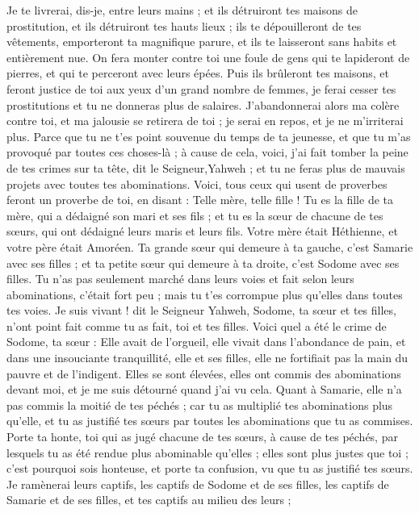\begin{multicols}{2}
Je te livrerai, dis-je, entre leurs mains ; et ils détruiront tes maisons de prostitution, et ils détruiront tes hauts lieux ; ils te dépouilleront de tes vêtements, emporteront ta magnifique parure, et ils te laisseront sans habits et entièrement nue.
On fera monter contre toi une foule de gens qui te lapideront de pierres, et qui te perceront avec leurs épées.
Puis ils brûleront tes maisons, et feront justice de toi aux yeux d’un grand nombre de femmes, je ferai cesser tes prostitutions et tu ne donneras plus de salaires.
J’abandonnerai alors ma colère contre toi, et ma jalousie se retirera de toi ; je serai en repos, et je ne m’irriterai plus.
Parce que tu ne t'es point souvenue du temps de ta jeunesse, et que tu m'as provoqué par toutes ces choses-là ; à cause de cela, voici, j'ai fait tomber la peine de tes crimes sur ta tête, dit le Seigneur,Yahweh ; et tu ne feras plus de mauvais projets avec toutes tes abominations.
Voici, tous ceux qui usent de proverbes feront un proverbe de toi, en disant : Telle mère, telle fille !
Tu es la fille de ta mère, qui a dédaigné son mari et ses fils ; et tu es la sœur de chacune de tes sœurs, qui ont dédaigné leurs maris et leurs fils. Votre mère était Héthienne, et votre père était Amoréen.
Ta grande sœur qui demeure à ta gauche, c'est Samarie avec ses filles ; et ta petite sœur qui demeure à ta droite, c'est Sodome avec ses filles.
Tu n'as pas seulement marché dans leurs voies et fait selon leurs abominations, c’était fort peu ; mais tu t'es corrompue plus qu'elles dans toutes tes voies.
Je suis vivant ! dit le Seigneur Yahweh,  Sodome, ta sœur et tes filles, n'ont point fait comme tu as fait, toi et tes filles.
Voici quel a été le crime de Sodome, ta sœur : Elle avait de l'orgueil, elle vivait dans l'abondance de pain, et dans une insouciante tranquillité, elle et ses filles, elle ne fortifiait pas la main du pauvre et de l’indigent.
Elles se sont élevées, elles ont commis des abominations devant moi, et je me suis détourné quand j’ai vu cela.
Quant à Samarie, elle n'a pas commis la moitié de tes péchés ; car tu as multiplié tes abominations plus qu'elle, et tu as justifié tes sœurs par toutes les abominations que tu as commises.
Porte ta honte, toi qui as jugé chacune de tes sœurs, à cause de tes péchés, par lesquels tu as été rendue plus abominable qu'elles ; elles sont plus justes que toi ; c'est pourquoi sois honteuse, et porte ta confusion, vu que tu as justifié tes sœurs.
Je ramènerai leurs captifs, les captifs de Sodome et de ses filles, les captifs de Samarie et de ses filles, et tes captifs au milieu des leurs ;

\end{multicols}
